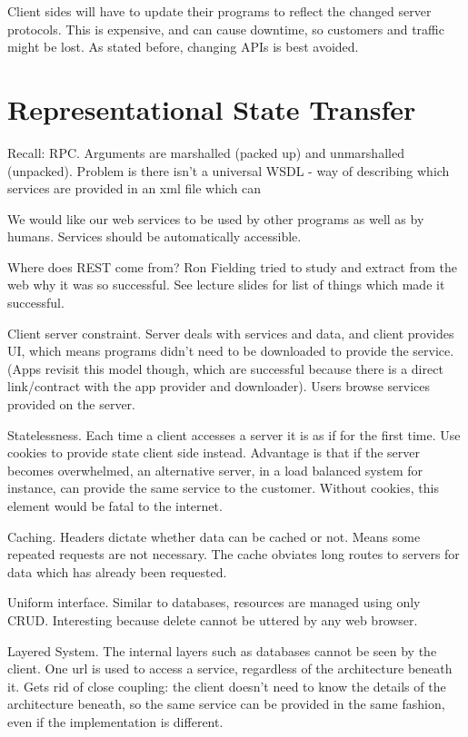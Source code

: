 \documentclass[11pt]{article}
\begin{document}
Client sides will have to update their programs to reflect the changed server protocols. This is expensive, and can cause downtime, so customers and traffic might be lost. As stated before, changing APIs is best avoided.



\section{Representational State Transfer}
\label{sec:ReST}

Recall: RPC. Arguments are marshalled (packed up) and unmarshalled (unpacked). Problem is there isn’t a universal WSDL - way of describing which services are provided in an xml file which can 

We would like our web services to be used by other programs as well as by humans. Services should be automatically accessible.

Where does REST come from? Ron Fielding tried to study and extract from the web why it was so successful. See lecture slides for list of things which made it successful.

Client server constraint. Server deals with services and data, and client provides UI, which means programs didn't need to be downloaded to provide the service. (Apps revisit this model though, which are successful because there is a direct link/contract with the app provider and downloader). Users browse services provided on the server.

Statelessness. Each time a client accesses a server it is as if for the first time. Use cookies to provide state client side instead. Advantage is that if the server becomes overwhelmed, an alternative server, in a load balanced system for instance, can provide the same service to the customer. Without cookies, this element would be fatal to the internet.

Caching. Headers dictate whether data can be cached or not. Means some repeated requests are not necessary. The cache obviates long routes to servers for data which has already been requested.

Uniform interface. Similar to databases, resources are managed using only CRUD. Interesting because delete cannot be uttered by any web browser.

Layered System. The internal layers such as databases cannot be seen by the client. One url is used to access a service, regardless of the architecture beneath it. Gets rid of close coupling: the client doesn't need to know the details of the architecture beneath, so the same service can be provided in the same fashion, even if the implementation is different.
\end{document}
